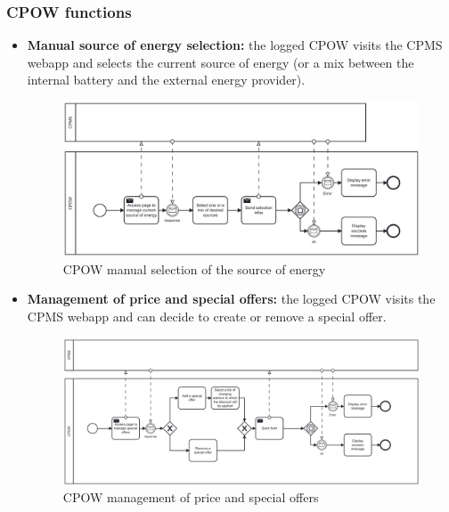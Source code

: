 \documentclass[table, 12pt]{article} %
\begin{document}
    \newpage
        \subsubsection{CPOW functions}
        \begin{itemize}                                 
            \item \textbf{Manual source of energy selection:} the logged CPOW visits the CPMS webapp and selects the current source of energy (or a mix between the internal battery and the external energy provider).
        
            \begin{center}
                \begin{figure}[!h]
                    \includegraphics[width=\textwidth]{assets/bpmn/CPOW_sel_source.png}
                    \caption{CPOW manual selection of the source of energy}
                    \label{fig: CPOW manual selection of the source of energy}
                \end{figure}
            \end{center}
        \end{itemize}
    \newpage
        \begin{itemize}                                 
            \item \textbf{Management of price and special offers:} the logged CPOW visits the CPMS webapp and can decide to create or remove a special offer.
        
            \begin{center}
                \begin{figure}[!h]
                    \includegraphics[width=\textwidth]{assets/bpmn/CPOW_sel_offer.png}
                    \caption{CPOW management of price and special offers}
                    \label{fig: CPOW management of price and special offers}
                \end{figure}
            \end{center}
        \end{itemize}
    
\end{document}
